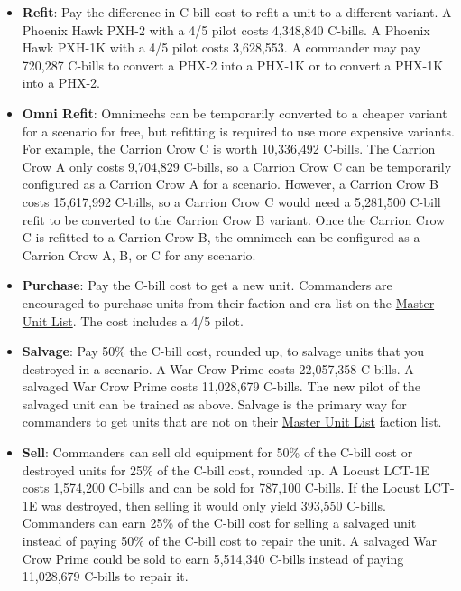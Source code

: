 \documentclass[UTF8]{article}
\begin{document}
\begin{itemize}
\item {\bf Refit}: Pay the difference in C-bill cost to refit a unit to a different variant.
A Phoenix Hawk PXH-2 with a 4/5 pilot costs 4,348,840 C-bills.
A Phoenix Hawk PXH-1K with a 4/5 pilot costs 3,628,553.
A commander may pay 720,287 C-bills to convert a PHX-2 into a PHX-1K or to convert a PHX-1K into a PHX-2.

\item {\bf Omni Refit}: Omnimechs can be temporarily converted to a cheaper variant for a scenario for free, but refitting is required to use more expensive variants.
For example, the Carrion Crow C is worth 10,336,492 C-bills.
The Carrion Crow A only costs 9,704,829 C-bills, so a Carrion Crow C can be temporarily configured as a Carrion Crow A for a scenario.
However, a Carrion Crow B costs 15,617,992 C-bills, so a Carrion Crow C would need a 5,281,500 C-bill refit to be converted to the Carrion Crow B variant.
Once the Carrion Crow C is refitted to a Carrion Crow B, the omnimech can be configured as a Carrion Crow A, B, or C for any scenario.

\item {\bf Purchase}: Pay the C-bill cost to get a new unit.
Commanders are encouraged to purchase units from their faction and era list on the \href{http://www.masterunitlist.info/}{Master Unit List}.
The cost includes a 4/5 pilot.

\item {\bf Salvage}: Pay 50\% the C-bill cost, rounded up, to salvage units that you destroyed in a scenario.
A War Crow Prime costs 22,057,358 C-bills.
A salvaged War Crow Prime costs 11,028,679 C-bills.
The new pilot of the salvaged unit can be trained as above.
Salvage is the primary way for commanders to get units that are not on their \href{http://www.masterunitlist.info/}{Master Unit List} faction list.

\item {\bf Sell}: Commanders can sell old equipment for 50\% of the C-bill cost or destroyed units for 25\% of the C-bill cost, rounded up.
A Locust LCT-1E costs 1,574,200 C-bills and can be sold for 787,100 C-bills.
If the Locust LCT-1E was destroyed, then selling it would only yield 393,550 C-bills.
Commanders can earn 25\% of the C-bill cost for selling a salvaged unit instead of paying 50\% of the C-bill cost to repair the unit.
A salvaged War Crow Prime could be sold to earn 5,514,340 C-bills instead of paying 11,028,679 C-bills to repair it.

\end{itemize}
\end{document}

